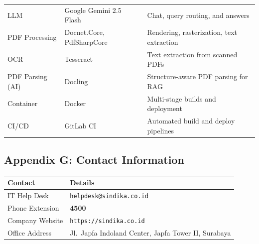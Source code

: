 \begin{tabularx}{\textwidth}{@{} l l X @{}}
  LLM & Google Gemini 2.5 Flash
    & Chat, query routing, and answers \\
  PDF Processing & Docnet.Core, PdfSharpCore
    & Rendering, rasterization, text extraction \\
  OCR & Tesseract
    & Text extraction from scanned PDFs \\
  PDF Parsing (AI) & Docling
    & Structure-aware PDF parsing for RAG \\
  Container & Docker
    & Multi-stage builds and deployment \\
  CI/CD & GitLab CI
    & Automated build and deploy pipelines \\
  \bottomrule
\end{tabularx}

\subsection{Appendix G: Contact Information}

\begin{tabularx}{\textwidth}{@{} l X @{}}
  \toprule
  \textbf{Contact} & \textbf{Details} \\
  \midrule
  IT Help Desk
    & \texttt{helpdesk@sindika.co.id} \\
  Phone Extension
    & \textbf{4500} \\
  Company Website
    & \texttt{https://sindika.co.id} \\
  Office Address
    & Jl.\ Japfa Indoland Center, Japfa Tower II, Surabaya \\
  \bottomrule
\end{tabularx}
